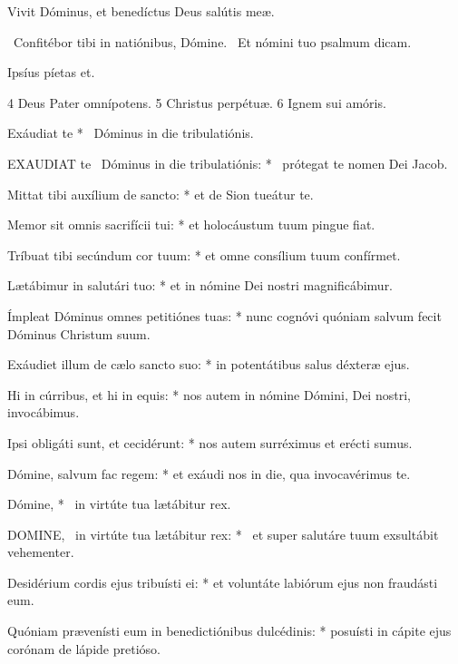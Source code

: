  Vivit Dóminus, et benedíctus Deus salútis meæ.


\V\ Confitébor tibi in natiónibus, Dómine. \R\ Et nómini tuo psalmum dicam.

 Ipsíus píetas et.

 4 Deus Pater omnípotens. 5 Christus perpétuæ. 6 Ignem sui amóris.


 Exáudiat te * \textdagger\ Dóminus in die tribulatiónis. \textdagger


\lettrine[lines=2]{E}{XAUDIAT} te \textdagger\ Dóminus in die tribulatiónis: * \textdagger\ prótegat te nomen Dei Jacob.

Mittat tibi auxílium de sancto: * et de Sion tueátur te.

Memor sit omnis sacrifícii tui: * et holocáustum tuum pingue fiat.

Tríbuat tibi secúndum cor tuum: * et omne consílium tuum confírmet.

Lætábimur in salutári tuo: * et in nómine Dei nostri magnificábimur.

Ímpleat Dóminus omnes petitiónes tuas: * nunc cognóvi quóniam salvum fecit Dóminus Christum suum.

Exáudiet illum de cælo sancto suo: * in potentátibus salus déxteræ ejus.

Hi in cúrribus, et hi in equis: * nos autem in nómine Dómini, Dei nostri, invocábimus.

Ipsi obligáti sunt, et cecidérunt: * nos autem surréximus et erécti sumus.

Dómine, salvum fac regem: * et exáudi nos in die, qua invocavérimus te.

 Dómine, * \textdagger\ in virtúte tua lætábitur rex. \textdaggerdbl


\lettrine[lines=2]{D}{OMINE}, \textdagger\ in virtúte tua lætábitur rex: * \textdaggerdbl\ et super salutáre tuum exsultábit vehementer.

Desidérium cordis ejus tribuísti ei: * et voluntáte labiórum ejus non fraudásti eum.

Quóniam prævenísti eum in benedictiónibus dulcédinis: * posuísti in cápite ejus corónam de lápide pretióso.

